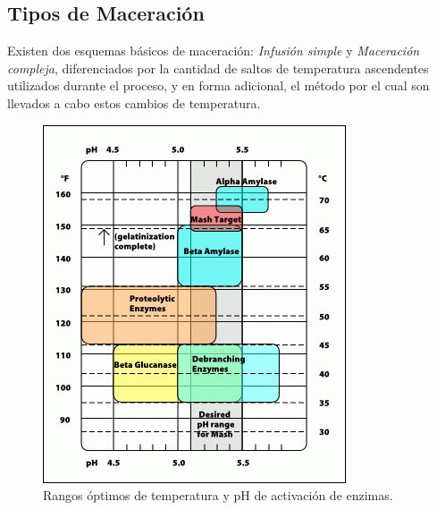         \subsection{Tipos de Maceración}
            \par Existen dos esquemas básicos de maceración: \textit{Infusión simple} y \textit{Maceración compleja}, diferenciados por la cantidad de saltos de temperatura ascendentes utilizados durante el proceso, y en forma adicional, el método por el cual son llevados a cabo estos cambios de temperatura.
            
            \begin{figure} [H]		                                                                    \centerline{\includegraphics[scale=1]{activacion_enzimas_t_ph.jpg}}
                \caption{Rangos óptimos de temperatura y pH de activación de enzimas.}
                \label{ActivacionEnzimasTpH}
            \end{figure}
            

